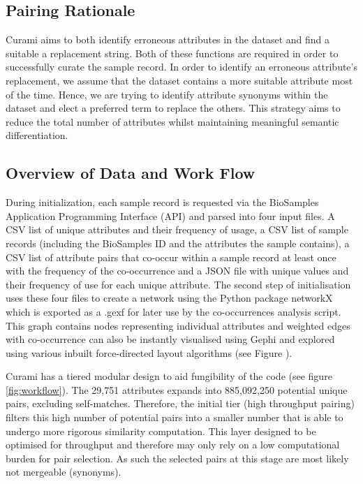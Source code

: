 \documentclass{bmcart}
\begin{document}
\subsection*{Pairing Rationale}

Curami aims to both identify erroneous attributes in the dataset and find a suitable a replacement string. Both of these functions are required in order to successfully curate the sample record. In order to identify an erroneous attribute's replacement, we assume that the dataset contains a more suitable attribute most of the time. Hence, we are trying to identify attribute synonyms within the dataset and elect a preferred term to replace the others. This strategy aims to reduce the total number of attributes whilst maintaining meaningful semantic differentiation.

\subsection*{Overview of Data and Work Flow}

During initialization, each sample record is requested via the BioSamples Application Programming Interface (API) and parsed into four input files. A CSV list of unique attributes and their frequency of usage, a CSV list of sample records (including the BioSamples ID and the attributes the sample contains), a CSV list of attribute pairs that co-occur within a sample record at least once with the frequency of the co-occurrence and a JSON file with unique values and their frequency of use for each unique attribute. The second step of initialisation uses these four files to create a network using the Python package networkX \cite{networkx} which is exported as a .gexf for later use by the co-occurrences analysis script. This graph contains nodes representing individual attributes and weighted edges with co-occurrence can also be instantly visualised using Gephi \cite{bastian2009gephi} and explored using various inbuilt force-directed layout algorithms \cite{jacomy2014forceatlas2} (see Figure \cite{fig:gephi}).

Curami has a tiered modular design to aid fungibility of the code (see figure \ref{fig:workflow}). The 29,751 attributes expands into 885,092,250 potential unique pairs, excluding self-matches. Therefore, the initial tier (high throughput pairing) filters this high number of potential pairs into a smaller number that is able to undergo more rigorous similarity computation. This layer designed to be optimised for throughput and therefore may only rely on a low computational burden for pair selection. As such the selected pairs at this stage are most likely not mergeable (synonyms).
\end{document}
